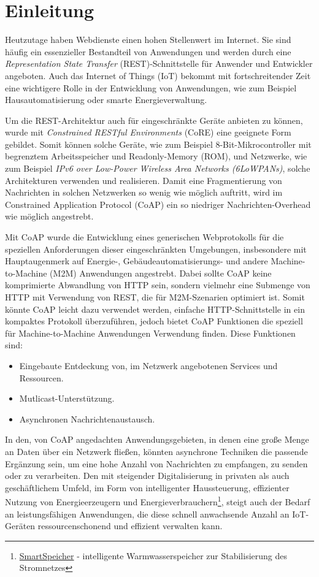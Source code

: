 \section{Einleitung}
\label{sec:einleitung}

Heutzutage haben Webdienste einen hohen Stellenwert im Internet. Sie sind häufig ein essenzieller Bestandteil von Anwendungen und werden durch eine \textit{Representation State Transfer} (REST)-Schnittstelle für Anwender und Entwickler angeboten. Auch das Internet of Things (IoT) bekommt mit fortschreitender Zeit eine wichtigere Rolle in der Entwicklung von Anwendungen, wie zum Beispiel Hausautomatisierung oder smarte Energieverwaltung.

Um die REST-Architektur auch für eingeschränkte Geräte anbieten zu können, wurde mit \textit{Constrained RESTful Environments} (CoRE) eine geeignete Form gebildet. Somit können solche Geräte, wie zum Beispiel 8-Bit-Mikrocontroller mit begrenztem Arbeitsspeicher und Readonly-Memory (ROM), und Netzwerke, wie zum Beispiel \textit{IPv6 over Low-Power Wireless Area Networks (6LoWPANs)}, solche Architekturen verwenden und realisieren. Damit eine Fragmentierung von Nachrichten in solchen Netzwerken so wenig wie möglich auftritt, wird im Constrained Application Protocol (CoAP) ein so niedriger Nachrichten-Overhead wie möglich angestrebt.

Mit CoAP wurde die Entwicklung eines generischen Webprotokolls für die speziellen Anforderungen dieser eingeschränkten Umgebungen, insbesondere mit Hauptaugenmerk auf Energie-, Gebäudeautomatisierungs- und andere Machine-to-Machine (M2M) Anwendungen angestrebt. Dabei sollte CoAP keine komprimierte Abwandlung von HTTP sein, sondern vielmehr eine Submenge von HTTP mit Verwendung von REST, die für M2M-Szenarien optimiert ist. Somit könnte CoAP leicht dazu verwendet werden, einfache HTTP-Schnittstelle in ein kompaktes Protokoll überzuführen, jedoch bietet CoAP Funktionen die speziell für Machine-to-Machine Anwendungen Verwendung finden. Diese Funktionen sind:
\begin{itemize}
    \item Eingebaute Entdeckung von, im Netzwerk angebotenen Services und Ressourcen.
    \item Mutlicast-Unterstützung.
    \item Asynchronen Nachrichtenaustausch.
\end{itemize}

In den, von CoAP angedachten Anwendungsgebieten, in denen eine große Menge an Daten über ein Netzwerk fließen, könnten asynchrone Techniken die passende Ergänzung sein, um eine hohe Anzahl von Nachrichten zu empfangen, zu senden oder zu verarbeiten. Den mit steigender Digitalisierung in privaten als auch geschäftlichem Umfeld, im Form von intelligenter Haussteuerung, effizienter Nutzung von Energieerzeugern und Energieverbrauchern\footnote{\href{https://www.a1energysolutions.at/smartspeicher/}{SmartSpeicher} - intelligente Warmwasserspeicher zur Stabilisierung des Stromnetzes}, steigt auch der Bedarf an leistungsfähigen Anwendungen, die diese schnell anwachsende Anzahl an IoT-Geräten ressourcenschonend und effizient verwalten kann. 

